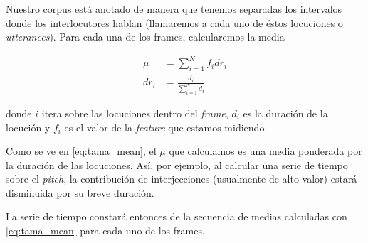 Nuestro corpus está anotado de manera que tenemos separadas los intervalos donde los interlocutores hablan (llamaremos a cada uno de éstos locuciones o \emph{utterances}). Para cada una de los frames, calcularemos la media

\begin{align}
    \mu &= \sum\limits_{i=1}^N f_i dr_i \label{eq:tama_mean}\\
    dr_i &= \frac{d_i}{\sum\limits_{i=1}^N d_i}
\end{align}

donde $i$ itera sobre las locuciones dentro del \emph{frame}, $d_i$ es la duración de la locución y $f_i$ es el valor de la \emph{feature} que estamos midiendo.

Como se ve en \ref{eq:tama_mean}, el $\mu$ que calculamos es una media ponderada por la duración de las locuciones. Así, por ejemplo, al calcular una serie de tiempo sobre el \emph{pitch}, la contribución de interjecciones (usualmente de alto valor) estará disminuída por su breve duración.

La serie de tiempo constará entonces de la secuencia de medias calculadas con \ref{eq:tama_mean} para cada uno de los frames.


